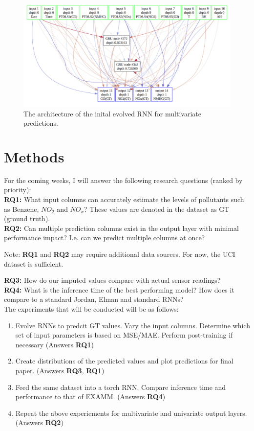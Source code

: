 \documentclass[12pt]{article}
\begin{document}
\begin{figure}
    \includegraphics[width=\linewidth]{resources/init_genome_mv0.png}
    \caption{The architecture of the inital evolved RNN for multivariate predictions.}
\end{figure}

\section{Methods}
For the coming weeks, I will answer the following research questions (ranked by priority):\\
\textbf{RQ1:} What input columns can accurately estimate the levels of pollutants such as Benzene, $NO_2$ and $NO_x$? These values are denoted in the dataset as GT (ground truth).\\
\textbf{RQ2:} Can multiple prediction columns exist in the output layer with minimal performance impact? I.e. can we predict multiple columns at once? \\
\begin{footnotesize}
    Note: \textbf{RQ1} and \textbf{RQ2} may require additional data sources. For now, the UCI dataset is sufficient.\\
\end{footnotesize}
\textbf{RQ3:} How do our imputed values compare with actual sensor readings?\\
\textbf{RQ4:} What is the inference time of the best performing model? How does it compare to a standard Jordan, Elman and standard RNNs? \\
The experiments that will be conducted will be as follows:
\begin{enumerate}
    \item
        Evolve RNNs to predcit GT values. Vary the input columns. Determine which set of input parameters is  based on MSE/MAE. Perform post-training if necessary (Answers \textbf{RQ1})
    \item
        Create distributions of the predicted values and plot predictions for final paper. (Answers \textbf{RQ3}, \textbf{RQ1})
    \item
        Feed the same dataset into a torch RNN. Compare inference time and performance to that of EXAMM. (Answers \textbf{RQ4})
    \item
        Repeat the above experiements for multivariate and univariate output layers. (Answers \textbf{RQ2})
\end{enumerate}
\end{document}

